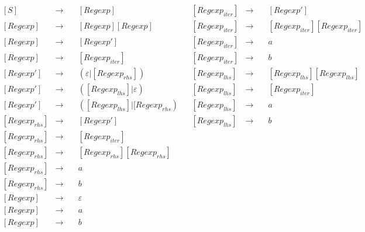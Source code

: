 \documentclass[a4paper, 14pt]{article}
\begin{document}
$$
\begin{aligned}
  &[S] &\rightarrow \quad &{[Regexp]} & &[Regexp_{iter}] &\rightarrow \quad  &[Regexp'] \\
  &[Regexp] &\rightarrow \quad &{[Regexp][Regexp]} & &[Regexp_{iter}] &\rightarrow \quad &[Regexp_{iter}][Regexp_{iter}] \\ 
  &[Regexp] &\rightarrow \quad &{[Regexp']} & &[Regexp_{iter}] &\rightarrow \quad &a \\
  &[Regexp] &\rightarrow \quad &{[Regexp_{iter}]} & &[Regexp_{iter}] &\rightarrow \quad &b\\
  &[Regexp'] &\rightarrow \quad &{(\varepsilon|[Regexp_{rhs}])} & &[Regexp_{lhs}] &\rightarrow \quad &{[Regexp_{lhs}][Regexp_{lhs}]} \\
  &[Regexp'] &\rightarrow \quad &{([Regexp_{lhs}]|\varepsilon)} & &[Regexp_{lhs}] &\rightarrow \quad  &{[Regexp_{iter}]} \\
  &[Regexp'] &\rightarrow \quad &{([Regexp_{lhs}]|[Regexp_{rhs})} & &[Regexp_{lhs}] &\rightarrow \quad  &a \\
  &[Regexp_{rhs}] &\rightarrow \quad &{[Regexp']} & &[Regexp_{lhs}] &\rightarrow \quad  &b \\ 
  &[Regexp_{rhs}] &\rightarrow \quad &{[Regexp_{iter}]} \\ 
  &[Regexp_{rhs}] &\rightarrow \quad &{[Regexp_{rhs}][Regexp_{rhs}]} \\
  &[Regexp_{rhs}] &\rightarrow \quad &a \\
  &[Regexp_{rhs}] &\rightarrow \quad &b \\
  &[Regexp] &\rightarrow \quad &\varepsilon \\
  &[Regexp] &\rightarrow \quad &a \\
  &[Regexp] &\rightarrow \quad &b 
\end{aligned}
$$
\end{document}
